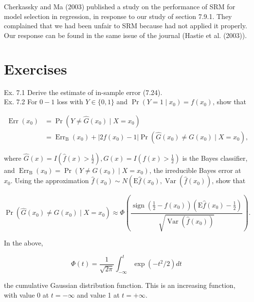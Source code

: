 \documentclass[10pt]{article}
\begin{document}
Cherkassky and Ma (2003) published a study on the performance of SRM for model selection in regression, in response to our study of section 7.9.1. They complained that we had been unfair to SRM because had not applied it properly. Our response can be found in the same issue of the journal (Hastie et al. (2003)).

\section*{Exercises}
Ex. 7.1 Derive the estimate of in-sample error (7.24).\\
Ex. 7.2 For $0-1$ loss with $Y \in\{0,1\}$ and $\operatorname{Pr}\left(Y=1 \mid x_{0}\right)=f\left(x_{0}\right)$, show that


\begin{align*}
\operatorname{Err}\left(x_{0}\right) & =\operatorname{Pr}\left(Y \neq \hat{G}\left(x_{0}\right) \mid X=x_{0}\right) \\
& =\operatorname{Err}_{\mathrm{B}}\left(x_{0}\right)+\left|2 f\left(x_{0}\right)-1\right| \operatorname{Pr}\left(\hat{G}\left(x_{0}\right) \neq G\left(x_{0}\right) \mid X=x_{0}\right), \tag{7.62}
\end{align*}


where $\hat{G}(x)=I\left(\hat{f}(x)>\frac{1}{2}\right), G(x)=I\left(f(x)>\frac{1}{2}\right)$ is the Bayes classifier, and $\operatorname{Err}_{\mathrm{B}}\left(x_{0}\right)=\operatorname{Pr}\left(Y \neq G\left(x_{0}\right) \mid X=x_{0}\right)$, the irreducible Bayes error at $x_{0}$. Using the approximation $\hat{f}\left(x_{0}\right) \sim N\left(\mathrm{E} \hat{f}\left(x_{0}\right), \operatorname{Var}\left(\hat{f}\left(x_{0}\right)\right)\right.$, show that


\begin{equation*}
\operatorname{Pr}\left(\hat{G}\left(x_{0}\right) \neq G\left(x_{0}\right) \mid X=x_{0}\right) \approx \Phi\left(\frac{\operatorname{sign}\left(\frac{1}{2}-f\left(x_{0}\right)\right)\left(\mathrm{E} \hat{f}\left(x_{0}\right)-\frac{1}{2}\right)}{\sqrt{\operatorname{Var}\left(\hat{f}\left(x_{0}\right)\right)}}\right) . \tag{7.63}
\end{equation*}


In the above,

$$
\Phi(t)=\frac{1}{\sqrt{2 \pi}} \int_{-\infty}^{t} \exp \left(-t^{2} / 2\right) d t
$$

the cumulative Gaussian distribution function. This is an increasing function, with value 0 at $t=-\infty$ and value 1 at $t=+\infty$.
\end{document}

